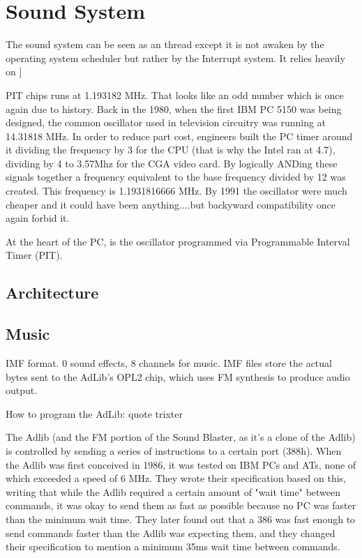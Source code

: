 \section{Sound System}
The sound system can be seen as an thread except it is not awaken by the operating system scheduler but rather by the Interrupt system. It relies heavily on 
]\par
PIT chips runs at 1.193182 MHz. That looks like an odd number which is once again due to history. Back in the 1980, when the first IBM PC 5150 was being designed, the common oscillator used in television circuitry was running at 14.31818 MHz. In order to reduce part cost, engineers built the PC timer around it dividing the frequency by 3 for the CPU (that is why the Intel ran at 4.7), dividing by 4 to 3.57Mhz for the CGA video card. By logically ANDing these signals together a frequency equivalent to the base frequency divided by 12 was created. This frequency is 1.1931816666 MHz. By 1991 the oscillator were much cheaper and it could have been anything....but backyward compatibility once again forbid it.\\
\par
At the heart of the PC, is the oscillator programmed via Programmable Interval Timer (PIT).\\



\subsection{Architecture}




\subsection{Music}
IMF format. 0 sound effects, 8 channels for music. IMF files store the actual bytes sent to the AdLib's OPL2 chip, which uses FM synthesis to produce audio output.

How to program the AdLib: quote trixter

The Adlib (and the FM portion of the Sound Blaster, as it's a clone of the Adlib) is controlled by sending a series of instructions to a certain port (388h). When the Adlib was first conceived in 1986, it was tested on IBM PCs and ATs, none of which exceeded a speed of 6 MHz. They wrote their specification based on this, writing that while the Adlib required a certain amount of "wait time" between commands, it was okay to send them as fast as possible because no PC was faster than the minimum wait time. They later found out that a 386 was fast enough to send commands faster than the Adlib was expecting them, and they changed their specification to mention a minimum 35ms wait time between commands.

